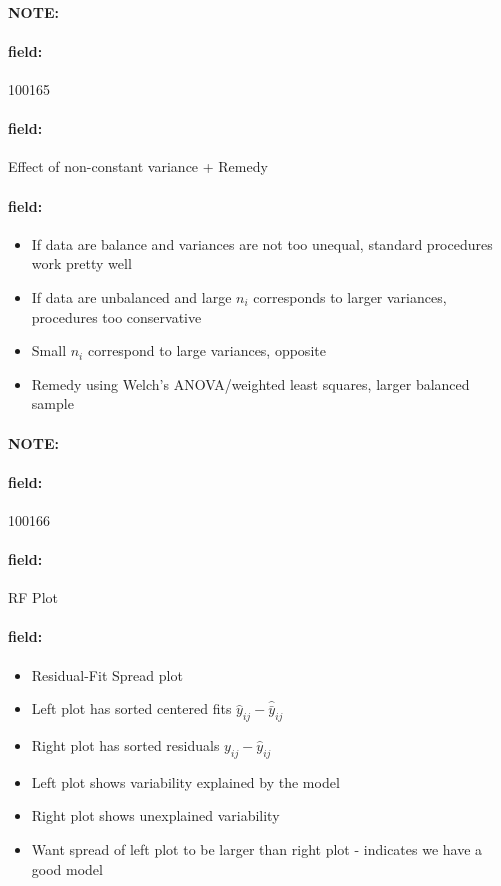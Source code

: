 \documentclass[12pt]{article}
\newenvironment{note}{\paragraph{NOTE:}}{}
\newenvironment{field}{\paragraph{field:}}{}
\begin{document}
\begin{note}
    \begin{field}
        \tiny 100165
    \end{field}
    \begin{field}
        Effect of non-constant variance + Remedy
    \end{field}
    \begin{field}
        \begin{itemize}
          \item If data are balance and variances are not too unequal, standard procedures work pretty well
          \item If data are unbalanced and large $n_i$ corresponds to larger variances, procedures too conservative
          \item Small $n_i$ correspond to large variances, opposite
          \item Remedy using Welch's ANOVA/weighted least squares, larger balanced sample
        \end{itemize}
    \end{field}
\end{note}


\begin{note}
    \begin{field}
        \tiny 100166
    \end{field}
    \begin{field}
        RF Plot
    \end{field}
    \begin{field}
        \begin{itemize}
          \item Residual-Fit Spread plot
          \item Left plot has sorted centered fits $\hat{y}_{ij} - \hat{\bar{y}}_{ij}$
          \item Right plot has sorted residuals $y_{ij} - \hat{y}_{ij}$
          \item Left plot shows variability explained by the model
          \item Right plot shows unexplained variability
          \item Want spread of left plot to be larger than right plot - indicates we have a good model
        \end{itemize}
    \end{field}
\end{note}
\end{document}
